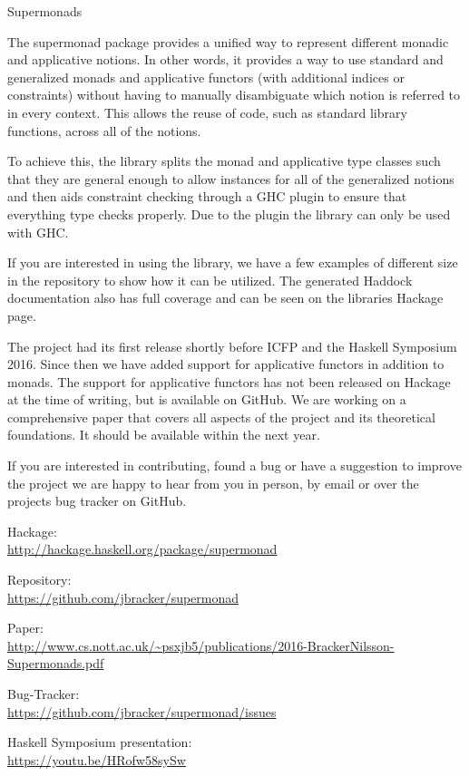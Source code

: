 \begin{hcarentry}{Supermonads}
\makeheader

The supermonad package provides a unified way to represent different monadic
and applicative notions. In other words, it provides a way to use standard and generalized
monads and applicative functors (with additional indices or constraints)
without having to manually disambiguate which notion is referred to in every context.
This allows the reuse of code, such as standard library functions, across all of 
the notions.

To achieve this, the library splits the monad and applicative type classes
such that they are general enough to allow instances for all of the generalized notions and
then aids constraint checking through a GHC plugin to ensure that everything
type checks properly. Due to the plugin the library can only be used with GHC.

If you are interested in using the library, we have a few examples of
different size in the repository to show how it can be utilized. The generated
Haddock documentation also has full coverage and can be seen on the libraries
Hackage page.

The project had its first release shortly before ICFP and the Haskell
Symposium 2016. Since then we have added support for applicative 
functors in addition to monads. The support for applicative 
functors has not been released on Hackage at the time of writing, 
but is available on GitHub.
We are working on a comprehensive paper that covers all aspects of the project
and its theoretical foundations.
It should be available within the next year.

If you are interested in contributing, found a bug or have a suggestion to
improve the project we are happy to hear from you in person, by email or over
the projects bug tracker on GitHub.

\FurtherReading
\begin{compactitem}
  \item Hackage:\\ \url{http://hackage.haskell.org/package/supermonad}
  \item Repository:\\ \url{https://github.com/jbracker/supermonad}
  \item Paper:\\
    \url{http://www.cs.nott.ac.uk/~psxjb5/publications/2016-BrackerNilsson-Supermonads.pdf}
  \item Bug-Tracker:\\ \url{https://github.com/jbracker/supermonad/issues}
  \item Haskell Symposium presentation:\\ \url{https://youtu.be/HRofw58sySw}
\end{compactitem}
\end{hcarentry}
